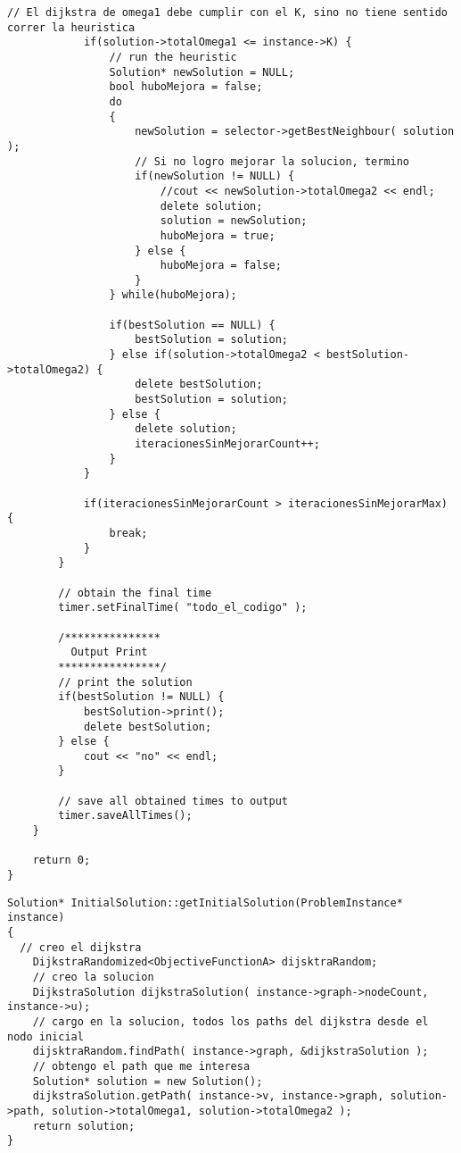 \begin{lstlisting}[caption=grasp.cpp]
            // El dijkstra de omega1 debe cumplir con el K, sino no tiene sentido correr la heuristica            
            if(solution->totalOmega1 <= instance->K) {                               
                // run the heuristic
                Solution* newSolution = NULL;    
                bool huboMejora = false;
                do
                {                                        
                    newSolution = selector->getBestNeighbour( solution );                                                            
                    // Si no logro mejorar la solucion, termino      
                    if(newSolution != NULL) {                        
                        //cout << newSolution->totalOmega2 << endl; 
                        delete solution;
                        solution = newSolution;          
                        huboMejora = true;                          
                    } else {                      
                        huboMejora = false;
                    }        
                } while(huboMejora);

                if(bestSolution == NULL) {
                    bestSolution = solution;
                } else if(solution->totalOmega2 < bestSolution->totalOmega2) {
                    delete bestSolution;
                    bestSolution = solution;
                } else {
                    delete solution;
                    iteracionesSinMejorarCount++;      
                }            
            }       

            if(iteracionesSinMejorarCount > iteracionesSinMejorarMax) {      
                break;
            }
        }  

        // obtain the final time
        timer.setFinalTime( "todo_el_codigo" );

        /***************
          Output Print
        ****************/
        // print the solution
        if(bestSolution != NULL) {
            bestSolution->print();
            delete bestSolution;
        } else {
            cout << "no" << endl;
        }    
        
        // save all obtained times to output
        timer.saveAllTimes();
    }    
    
    return 0;
}
\end{lstlisting}
\begin{lstlisting}[caption=InitialSolution::getInitialSolution()]
Solution* InitialSolution::getInitialSolution(ProblemInstance* instance)
{    
  // creo el dijkstra
    DijkstraRandomized<ObjectiveFunctionA> dijsktraRandom;
    // creo la solucion
    DijkstraSolution dijkstraSolution( instance->graph->nodeCount, instance->u);
    // cargo en la solucion, todos los paths del dijkstra desde el nodo inicial
    dijsktraRandom.findPath( instance->graph, &dijkstraSolution );
    // obtengo el path que me interesa
    Solution* solution = new Solution();    
    dijkstraSolution.getPath( instance->v, instance->graph, solution->path, solution->totalOmega1, solution->totalOmega2 );
    return solution;
}
\end{lstlisting}